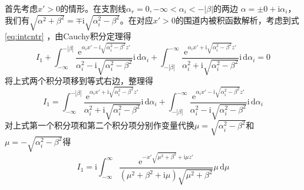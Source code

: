 首先考虑$x'>0$的情形。在支割线$\alpha_r=0,-\infty<\alpha_i<-|\beta|$的两边
$\alpha=\pm 0+\mathrm{i}\alpha_i$，我们有$\sqrt{\alpha^2+\beta^2}=\mp\mathrm{i}\sqrt{\alpha_i^2-\beta^2}$。在对应$x'>0$的围道内被积函数解析，考虑到式\eqref{eq:intcntr}
，由Cauchy积分定理得
\begin{equation*}
  I_1+\int_{-\infty}^{-|\beta|}
  \frac{\mathrm{e}^{\alpha_i x'-\mathrm{i}\sqrt{\alpha_i^2-\beta^2}z'}}{\alpha_i^2-
    \mathrm{i}\sqrt{\alpha_i^2-\beta^2}}\mathrm{i}\,\mathrm{d}\alpha_i
  +\int_{-|\beta|}^{-\infty}
  \frac{\mathrm{e}^{\alpha_i x'+\mathrm{i}\sqrt{\alpha_i^2-\beta^2}z'}}{\alpha_i^2+
    \mathrm{i}\sqrt{\alpha_i^2-\beta^2}}\mathrm{i}\,\mathrm{d}\alpha_i=0
\end{equation*}
将上式两个积分项移到等式右边，整理得
\begin{equation*}
  I_1=\int_{-\infty}^{-|\beta|}
  \frac{\mathrm{e}^{\alpha_i x'+\mathrm{i}\sqrt{\alpha_i^2-\beta^2}z'}}{\alpha_i^2+
    \mathrm{i}\sqrt{\alpha_i^2-\beta^2}}\mathrm{i}\,\mathrm{d}\alpha_i
  +\int_{-|\beta|}^{-\infty}
  \frac{\mathrm{e}^{\alpha_i x'-\mathrm{i}\sqrt{\alpha_i^2-\beta^2}z'}}{\alpha_i^2-
    \mathrm{i}\sqrt{\alpha_i^2-\beta^2}}\mathrm{i}\,\mathrm{d}\alpha_i
\end{equation*}
对上式第一个积分项和第二个积分项分别作变量代换$\mu=\sqrt{\alpha_i^2-\beta^2}$和
$\mu=-\sqrt{\alpha_i^2-\beta^2}$得
\begin{equation}
  I_1=\mathrm{i}\int_{-\infty}^{\infty}
  \frac{\mathrm{e}^{-x'\sqrt{\mu^2+\beta^2}+\mathrm{i}\mu z'}}{(\mu^2+\beta^2+\mathrm{i}\mu)\sqrt{\mu^2+\beta^2}}\mu\,\mathrm{d}\mu
  \label{eq:I1mu-a}
\end{equation}

